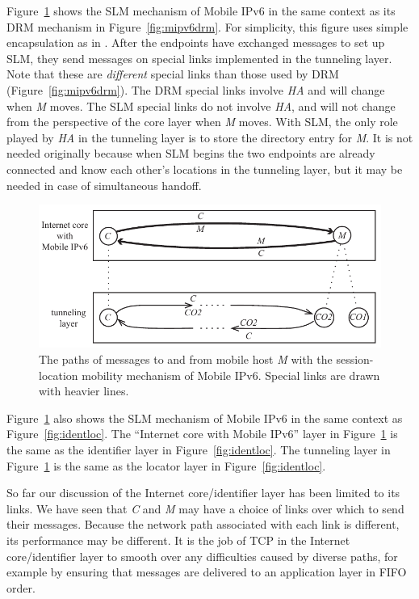 Figure~\ref{fig:mipv6slm} shows the SLM mechanism of Mobile IPv6 in
the same context as its DRM mechanism in Figure~\ref{fig:mipv6drm}.
For simplicity, this figure uses simple encapsulation as in 
\cite{mipv6old}.
After the endpoints have exchanged messages to set up SLM,
they send messages on special links implemented in the tunneling layer.
Note that these are {\it different} special links than those used
by DRM (Figure~\ref{fig:mipv6drm}).
The DRM special links involve {\it HA} and will change when {\it M}
moves.
The SLM special links do not involve {\it HA}, and will not change
from the perspective of the core layer when {\it M} moves.
With SLM, the only role played by {\it HA} in the tunneling layer is to
store the directory entry for {\it M}.
It is not needed originally because when SLM begins the two endpoints
are already connected and know each other's locations in the tunneling
layer, but it may be needed in case of simultaneous handoff.

\begin{figure}
\centering
\includegraphics[scale=1.00]{figures/mipv6slm.pdf}
\caption{The paths of messages to and from mobile host {\it M} with
the session-location mobility mechanism of Mobile IPv6.
Special links are drawn with heavier lines.}
\label{fig:mipv6slm}
\end{figure}

Figure~\ref{fig:mipv6slm} also shows the SLM mechanism of Mobile IPv6
in the same context as Figure~\ref{fig:identloc}.
The ``Internet core with Mobile IPv6'' layer in
Figure~\ref{fig:mipv6slm} is the same as the identifier layer in
Figure~\ref{fig:identloc}.
The tunneling layer in
Figure~\ref{fig:mipv6slm} is the same as the locator layer in
Figure~\ref{fig:identloc}.

So far our discussion of the Internet core/identifier
layer has been limited
to its links.
We have seen that {\it C} and {\it M} may have a choice of links
over which to send their messages.
Because the network path associated with each link is different,
its performance may be different.
It is the job of TCP in the Internet core/identifier layer to
smooth over any difficulties caused by diverse paths, for example
by ensuring that messages are delivered to an application layer in
FIFO order.

